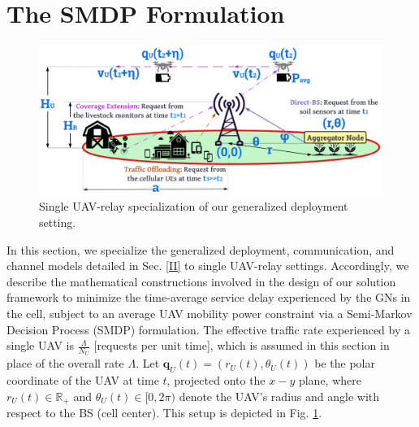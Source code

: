 \documentclass[10pt,twocolumn]{IEEEtran}
\begin{document}
\section{The SMDP Formulation}\label{III}
\begin{figure} [t]
    \centering
    \includegraphics[width=0.95\linewidth]{figs/Single_Agent_Specialization.png}
    \vspace{-2mm}
    \caption{Single UAV-relay specialization of our generalized deployment setting.}
    \vspace{-6mm}
    \label{F4}
\end{figure}
In this section, we specialize the generalized deployment, communication, and channel models detailed in Sec. \ref{II} to single UAV-relay settings. Accordingly, we describe the mathematical constructions involved in the design of our solution framework to minimize the time-average service delay experienced by the GNs in the cell, subject to an average UAV mobility power constraint via a Semi-Markov Decision Process (SMDP) formulation. The effective traffic rate experienced by a single UAV is $\frac{\Lambda}{N_U}$ [requests per unit time], which is assumed in this section in place of the overall rate $\Lambda$. Let $\mathbf{q}_{U}(t){=}(r_{U}(t),\theta_{U}(t))$ be the polar coordinate of the UAV at time $t$, projected onto the $x{-}y$ plane, where $r_{U}(t){\in}\mathbb{R}_{+}$ and $\theta_{U}(t){\in}[0,2\pi)$ denote the UAV's radius and angle with respect to the BS (cell center). This setup is depicted in Fig. \ref{F4}.
\end{document}
